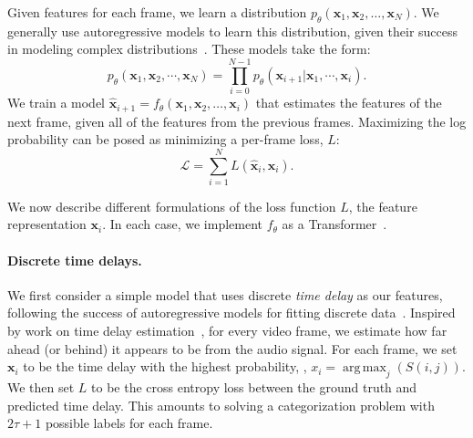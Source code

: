 \documentclass[10pt,twocolumn,letterpaper]{article}
\DeclareMathOperator*{\argmax}{arg\,max}
\newcommand{\bx}[0]{{\mathbf x}}
\newcommand{\mypar}[1]{\vspace{-3mm}\paragraph{#1}}
\begin{document}
Given features for each frame, we learn a distribution $p_\theta(\bx_1, \bx_2, \dots, \bx_N)$. We generally use autoregressive models to learn this distribution, given their success in modeling complex distributions~\cite{brown2020language,yu2022scaling}. These models take the form: 
\begin{equation}\label{chain_decom}
    p_\theta(\mathbf{x}_{1},\mathbf{x}_{2},\cdots,\mathbf{x}_{N}) = \prod_{i=0}^{N-1}p_\theta(\mathbf{x}_{i+1}|\mathbf{x}_{1},\cdots, \mathbf{x}_{i}).
\end{equation}
We train a model $\hat \bx_{i+1} = f_\theta(\bx_1, \bx_2, \dots, \bx_i)$ that estimates the features of the next frame, given all of the features from the previous frames. Maximizing the log probability can be posed as minimizing a per-frame loss, $L$:
\begin{equation}
\mathcal{L} = \sum_{i=1}^{N} L(\hat \bx_{i}, \bx_i).
\label{eq:loss}
\end{equation}

 We now describe different formulations of the loss function $L$, the feature representation $\bx_i$. In each case, we implement $f_\theta$ as a Transformer~\cite{vaswani2017attention}.




















\mypar{Discrete time delays.} 
We first consider a simple model that uses discrete {\em time delay} as our features, following the success of autoregressive models for fitting discrete data~\cite{van2017neural, razavi2019generating, esser2021taming}. Inspired by work on time delay estimation~\cite{knapp1976generalized,chen2022sound}, for every video frame, we estimate how far ahead (or behind) it appears to be from the audio signal. For each frame, we set $\mathbf{x}_{i}$ to be the time delay with the highest probability, \ie, $x_{i} = \argmax_j(S(i, j))$. We then set $L$ to be the cross entropy loss between the ground truth and predicted time delay. This amounts to solving a categorization problem with $2\tau + 1$ possible labels for each frame.
\end{document}
